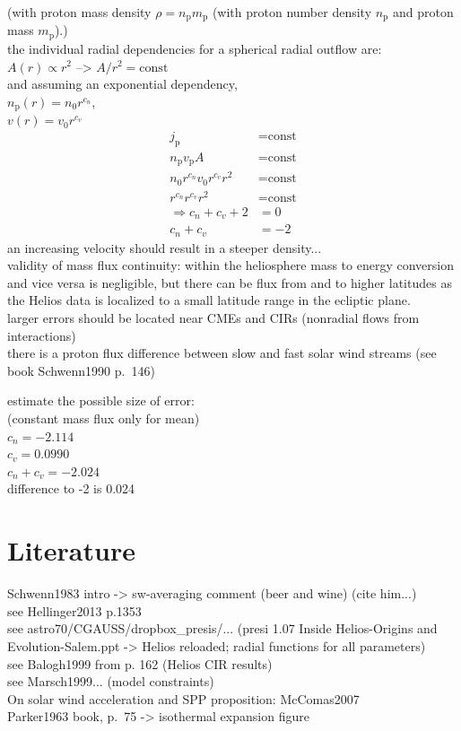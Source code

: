 (with proton mass density $\rho = n_\text{p} m_\text{p}$ (with proton number density $n_\text{p}$ and proton mass $m_\text{p}$).)\\

the individual radial dependencies for a spherical radial outflow are:\\
$A(r) \propto r^2$ --> $A/r^2 = \text{const}$\\
and assuming an exponential dependency,\\
$n_{\text{p}}(r) = n_0 r^{c_n}$,\\
$v(r) = v_0 r^{c_v}$\\
\begin{align}
	j_\text{p} &= \text{const}\\
	n_\text{p} v_\text{p} A &= \text{const}\\
	n_0 r^{c_n} v_0 r^{c_v} r^2 &= \text{const}\\
	r^{c_n} r^{c_v} r^2 &= \text{const}\\
	\Rightarrow c_n + c_v + 2 &= 0\\
	c_n + c_v &= -2
\end{align}
an increasing velocity should result in a steeper density...\\

validity of mass flux continuity: within the heliosphere mass to energy conversion and vice versa is negligible, but there can be flux from and to higher latitudes as the Helios data is localized to a small latitude range in the ecliptic plane.\\
larger errors should be located near CMEs and CIRs (nonradial flows from interactions)\\
there is a proton flux difference between slow and fast solar wind streams (see book Schwenn1990 p.~146)

estimate the possible size of error:\\
(constant mass flux only for mean)\\
$c_n = -2.114$\\
$c_v = 0.0990$\\
$c_n + c_v = -2.024$\\
difference to -2 is 0.024\\



\section{Literature}
Schwenn1983 intro -> sw-averaging comment (beer and wine) (cite him...)\\
see Hellinger2013 p.1353\\
see astro70/CGAUSS/dropbox\_presis/... (presi 1.07 Inside Helios-Origins and Evolution-Salem.ppt -> Helios reloaded; radial functions for all parameters)\\
see Balogh1999 from p. 162 (Helios CIR results)\\
see Marsch1999... (model constraints)\\
On solar wind acceleration and SPP proposition: McComas2007\\
Parker1963 book, p.~75 -> isothermal expansion figure\\	%

